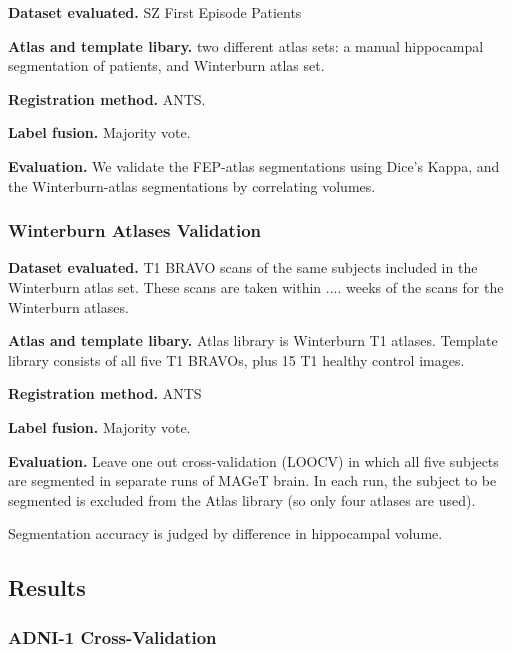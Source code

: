 \documentclass{article}\usepackage{graphicx, color}
\begin{document}
{\bf Dataset evaluated.} SZ First Episode Patients

{\bf Atlas and template libary.} two different atlas sets: a manual hippocampal
segmentation of patients, and Winterburn atlas set.  

{\bf Registration method.} ANTS.

{\bf Label fusion.} Majority vote.

{\bf Evaluation.} We validate the FEP-atlas segmentations using Dice's Kappa,
and the Winterburn-atlas segmentations by correlating volumes. 


\subsubsection{Winterburn Atlases Validation}
{\bf Dataset evaluated.} T1 BRAVO scans of the same subjects included in the 
Winterburn atlas set.  These scans are taken within .... weeks of the scans for 
the Winterburn atlases.

{\bf Atlas and template libary.} Atlas library is Winterburn T1 atlases.  
Template library consists of all five T1 BRAVOs, plus 15 T1 healthy control images.

{\bf Registration method.} ANTS

{\bf Label fusion.} Majority vote.

{\bf Evaluation.}  Leave one out cross-validation (LOOCV) in which all five
subjects are segmented in separate runs of MAGeT brain.  In each run, the subject
to be segmented is excluded from the Atlas library (so only four atlases are used).

Segmentation accuracy is judged by difference in hippocampal volume.



%
%
\subsection{Results}

\subsubsection{ADNI-1 Cross-Validation}
\end{document}
